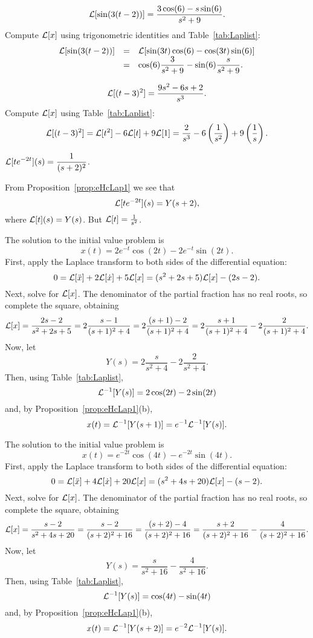 \documentclass{ximera}
\begin{document}
 \ans
\[
{\cal L}[\sin(3(t - 2))] = 
\frac{3\cos(6) - s\sin(6)}{s^2 + 9}.
\]
\soln Compute ${\cal L}[x]$ using trigonometric identities and
Table~\ref{tab:Laplist}:
\[
\begin{array}{rcl}
{\cal L}[\sin(3(t - 2))]
& = & {\cal L}[\sin(3t)\cos(6) - \cos(3t)\sin(6)] \\
& = & \displaystyle \cos(6)\frac{3}{s^2 + 9} - \sin(6)\frac{s}{s^2 + 9}.
\end{array}
\]

 \ans
\[
{\cal L}[(t - 3)^2] = \frac{9s^2 - 6s + 2}{s^3}.
\]
\soln Compute ${\cal L}[x]$ using Table~\ref{tab:Laplist}:
\[
{\cal L}[(t - 3)^2] = {\cal L}[t^2] - 6{\cal L}[t] + 9{\cal L}[1]
= \frac{2}{s^3} - 6\left(\frac{1}{s^2}\right) + 9\left(\frac{1}{s}
\right).
\]


 \ans $\displaystyle {\cal L}[te^{-2t}](s)=\frac{1}{(s+2)^2}$.

\soln  From Proposition~\ref{prop:eHcLap1} we see that
\[
{\cal L}[te^{-2t}](s) = Y(s+2),
\]
where ${\cal L}[t](s) = Y(s)$.  But ${\cal L}[t] = \frac{1}{s^2}$.

 \ans The solution to the initial value problem is
\[
x(t) = 2e^{-t}\cos(2t) - 2e^{-t}\sin(2t).
\]
\soln First, apply the Laplace transform to both sides of the differential
equation:
\[
0 = {\cal L}[\ddot{x}] + 2{\cal L}[\dot{x}] + 5{\cal L}[x]
= (s^2 + 2s + 5){\cal L}[x] - (2s - 2).
\]
Next, solve for ${\cal L}[x]$.  The denominator of the partial fraction
has no real roots, so complete the square, obtaining
\[
{\cal L}[x]
= \frac{2s - 2}{s^2 + 2s + 5}
= 2\frac{s - 1}{(s + 1)^2 + 4}
= 2\frac{(s + 1) - 2}{(s + 1)^2 + 4}
= 2\frac{s + 1}{(s + 1)^2 + 4} - 2\frac{2}{(s + 1)^2 + 4}.
\]
Now, let
\[
Y(s) = 2\frac{s}{s^2 + 4} - 2\frac{2}{s^2 + 4}.
\]
Then, using Table~\ref{tab:Laplist},
\[
{\cal L}^{-1}[Y(s)] = 2\cos(2t) - 2\sin(2t)
\]
and, by Proposition~\ref{prop:eHcLap1}(b),
\[
x(t) = {\cal L}^{-1}[Y(s + 1)] = e^{-1}{\cal L}^{-1}[Y(s)].
\]


 \ans The solution to the initial value problem is
\[
x(t) = e^{-2t}\cos(4t) - e^{-2t}\sin(4t).
\]
\soln First, apply the Laplace transform to both sides of the differential
equation:
\[
0 = {\cal L}[\ddot{x}] + 4{\cal L}[\dot{x}] + 20{\cal L}[x]
= (s^2 + 4s + 20){\cal L}[x] - (s - 2).
\]
Next, solve for ${\cal L}[x]$.  The denominator of the partial fraction
has no real roots, so complete the square, obtaining
\[
{\cal L}[x]
= \frac{s - 2}{s^2 + 4s + 20}
= \frac{s - 2}{(s + 2)^2 + 16}
= \frac{(s + 2) - 4}{(s + 2)^2 + 16}
= \frac{s + 2}{(s + 2)^2 + 16} - \frac{4}{(s + 2)^2 + 16}.
\]
Now, let
\[
Y(s) = \frac{s}{s^2 + 16} - \frac{4}{s^2 + 16}.
\]
Then, using Table~\ref{tab:Laplist},
\[
{\cal L}^{-1}[Y(s)] = \cos(4t) - \sin(4t)
\]
and, by Proposition~\ref{prop:eHcLap1}(b),
\[
x(t) = {\cal L}^{-1}[Y(s + 2)] = e^{-2}{\cal L}^{-1}[Y(s)].
\]
\end{document}
